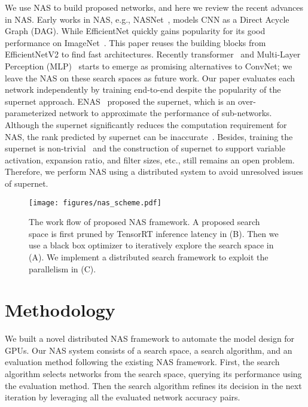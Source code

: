 \documentclass[10pt,twocolumn,letterpaper]{article}
\begin{document}
We use NAS to build proposed networks, and here we review the recent advances in NAS. Early works in NAS, e.g., NASNet~\cite{zoph2018learning}, models CNN as a Direct Acycle Graph (DAG). While EfficientNet quickly gains popularity for its good performance on ImageNet~\cite{xie2020self}. This paper reuses the building blocks from EfficientNetV2 to find fast architectures. Recently transformer~\cite{liu2021swin} and Multi-Layer Perception (MLP)~\cite{liu2021pay} starts to emerge as promising alternatives to ConvNet; we leave the NAS on these search spaces as future work. Our paper evaluates each network independently by training end-to-end despite the popularity of the supernet approach. ENAS~\cite{pham2018efficient} proposed the supernet, which is an over-parameterized network to approximate the performance of sub-networks. Although the supernet significantly reduces the computation requirement for NAS, the rank predicted by supernet can be inaccurate~\cite{zhao2021few}. Besides, training the supernet is non-trivial~\cite{yu2020train} and the construction of supernet to support variable activation, expansion ratio, and filter sizes, etc., still remains an open problem. Therefore, we perform NAS using a distributed system to avoid unresolved issues of supernet.

\begin{figure*}[t]
\vspace{-0.5cm}
\centering 
  \begin{center}
    \texttt{[image: figures/nas\_scheme.pdf]}
  \end{center}
      \vspace{-0.5cm}
    \caption{The work flow of proposed NAS framework. A proposed search space is first pruned by TensorRT inference latency in (B). Then we use a black box optimizer to iteratively explore the search space in (A). We implement
    a distributed search framework to exploit the parallelism in (C).}
    \label{fig:nas_framework}
\end{figure*}
\section{Methodology}

We built a novel distributed NAS framework to automate the model design for GPUs. Our NAS system consists of a search space, a search algorithm, and an evaluation method following the existing NAS framework. First, the search algorithm selects networks from the search space, querying its performance using the evaluation method. Then the search algorithm refines its decision in the next iteration by leveraging all the evaluated network accuracy pairs. 
\end{document}
